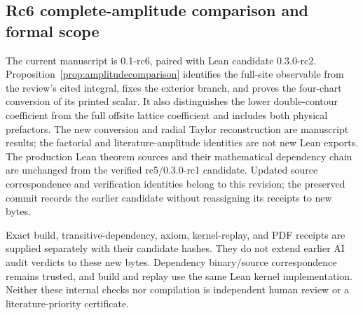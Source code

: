 \documentclass[11pt]{article}
\numberwithin{equation}{section}
\theoremstyle{definition}
\begin{document}
\subsection*{Rc6 complete-amplitude comparison and formal scope}
The current manuscript is 0.1-rc6, paired with Lean candidate 0.3.0-rc2.
Proposition~\ref{prop:amplitudecomparison} identifies the full-site
observable from the review's cited integral, fixes the exterior branch,
and proves the four-chart conversion of its printed scalar. It also
distinguishes the lower double-contour coefficient from the full offsite
lattice coefficient and includes both physical prefactors. The new
conversion and radial Taylor reconstruction are manuscript results;
the factorial and literature-amplitude identities are not new Lean exports.
The production Lean theorem sources and their mathematical dependency
chain are unchanged from the verified rc5/0.3.0-rc1 candidate. Updated
source correspondence and verification identities belong to this revision;
the preserved commit records the earlier candidate without reassigning its
receipts to new bytes.

Exact build, transitive-dependency, axiom, kernel-replay, and PDF receipts
are supplied separately with their candidate hashes. They do not extend
earlier AI audit verdicts to these new bytes. Dependency binary/source
correspondence remains trusted, and build and replay use the same Lean
kernel implementation. Neither these internal checks nor compilation is
independent human review or a literature-priority certificate.
\end{document}
